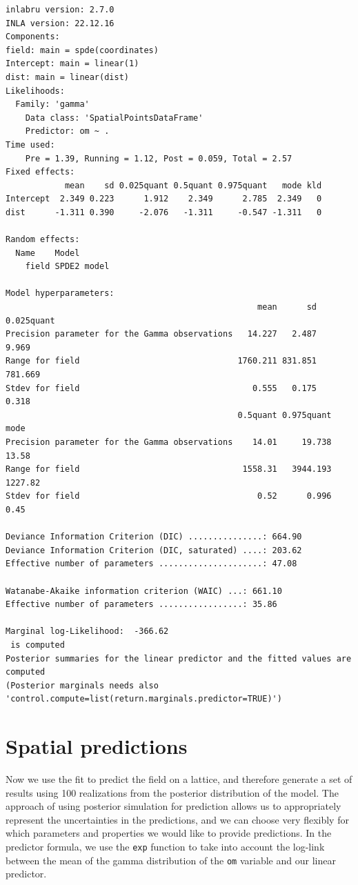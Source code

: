\documentclass[
  a4paper,
]{article}
\begin{document}
\begin{verbatim}
inlabru version: 2.7.0
INLA version: 22.12.16
Components:
field: main = spde(coordinates)
Intercept: main = linear(1)
dist: main = linear(dist)
Likelihoods:
  Family: 'gamma'
    Data class: 'SpatialPointsDataFrame'
    Predictor: om ~ .
Time used:
    Pre = 1.39, Running = 1.12, Post = 0.059, Total = 2.57 
Fixed effects:
            mean    sd 0.025quant 0.5quant 0.975quant   mode kld
Intercept  2.349 0.223      1.912    2.349      2.785  2.349   0
dist      -1.311 0.390     -2.076   -1.311     -0.547 -1.311   0

Random effects:
  Name    Model
    field SPDE2 model

Model hyperparameters:
                                                   mean      sd 0.025quant
Precision parameter for the Gamma observations   14.227   2.487      9.969
Range for field                                1760.211 831.851    781.669
Stdev for field                                   0.555   0.175      0.318
                                               0.5quant 0.975quant    mode
Precision parameter for the Gamma observations    14.01     19.738   13.58
Range for field                                 1558.31   3944.193 1227.82
Stdev for field                                    0.52      0.996    0.45

Deviance Information Criterion (DIC) ...............: 664.90
Deviance Information Criterion (DIC, saturated) ....: 203.62
Effective number of parameters .....................: 47.08

Watanabe-Akaike information criterion (WAIC) ...: 661.10
Effective number of parameters .................: 35.86

Marginal log-Likelihood:  -366.62 
 is computed 
Posterior summaries for the linear predictor and the fitted values are computed
(Posterior marginals needs also 'control.compute=list(return.marginals.predictor=TRUE)')
\end{verbatim}

\hypertarget{spatial-predictions}{%
\section{Spatial predictions}\label{spatial-predictions}}

Now we use the fit to predict the field on a lattice, and therefore
generate a set of results using 100 realizations from the posterior
distribution of the model. The approach of using posterior simulation
for prediction allows us to appropriately represent the uncertainties in
the predictions, and we can choose very flexibly for which parameters
and properties we would like to provide predictions. In the predictor
formula, we use the \texttt{exp} function to take into account the
log-link between the mean of the gamma distribution of the \texttt{om}
variable and our linear predictor.
\end{document}
